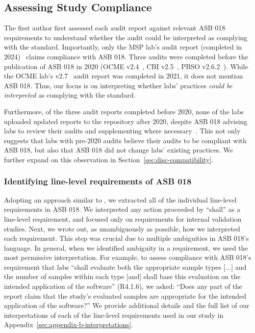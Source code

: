 \subsection{Assessing Study Compliance}
\label{sec:methods-assessing-compliance}
The first author first assessed each audit report against relevant ASB 018 requirements to understand whether the audit could be interpreted as complying with the standard. Importantly, only the MSP lab's audit report (completed in 2024)~\cite{mspIV} claims compliance with ASB 018. Three audits were completed before the publication of ASB 018 in 2020 (OCME v2.4~\cite{ocmeIV}, CBI v2.5~\cite{cbiIV}, PBSO v2.6.2~\cite{pbsoIV}). While the OCME lab's v2.7~\cite{ocmeIV2.7} audit report was completed in 2021, it does not mention ASB 018. Thus, our focus is on interpreting whether labs' practices \textit{could be interpreted} as complying with the standard. 

Furthermore, of the three audit reports completed before 2020, none of the labs uploaded updated reports to the repository after 2020, despite ASB 018 advising labs to review their audits and supplementing where necessary~\cite{asb018}. This not only suggests that labs with pre-2020 audits believe their audits to be compliant with ASB 018, but also that ASB 018 did not change labs' existing practices. We further expand on this observation in Section~\ref{sec:disc-compatibility}.


\subsubsection{Identifying line-level requirements of ASB 018} 
\label{subsubsec:line-level-reqs}
Adopting an approach similar to \citet{lawrence2023bureaucratic}, we extracted all of the individual line-level requirements in ASB 018. We interpreted any action proceeded by ``shall'' as a line-level requirement, and focused only on requirements for internal validation studies. Next, we wrote out, as unambiguously as possible, how we interpreted each requirement. This step was crucial due to multiple ambiguities in ASB 018's language. In general, when we identified ambiguity in a requirement, we used the most permissive interpretation. For example, to assess compliance with ASB 018's requirement that labs ``shall evaluate both the appropriate sample types [...] and the number of samples within each type [and] shall base this evaluation on the intended application of the software'' (R4.1.6), we asked: ``Does any part of the report claim that the study's evaluated samples are appropriate for the intended application of the software?''  We provide additional details and the full list of our interpretations of each of the line-level requirements used in our study in Appendix~\ref{sec:appendix-b-interpretations}.


